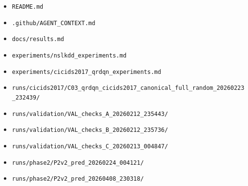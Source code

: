 \documentclass[12pt,a4paper]{report}
\begin{document}
\begin{itemize}
    \item \texttt{README.md}
    \item \texttt{.github/AGENT\_CONTEXT.md}
    \item \texttt{docs/results.md}
    \item \texttt{experiments/nslkdd\_experiments.md}
    \item \texttt{experiments/cicids2017\_qrdqn\_experiments.md}
    \item \texttt{runs/cicids2017/C03\_qrdqn\_cicids2017\_canonical\_full\_random\_20260223\_232439/}
    \item \texttt{runs/validation/VAL\_checks\_A\_20260212\_235443/}
    \item \texttt{runs/validation/VAL\_checks\_B\_20260212\_235736/}
    \item \texttt{runs/validation/VAL\_checks\_C\_20260213\_004847/}
    \item \texttt{runs/phase2/P2v2\_pred\_20260224\_004121/}
    \item \texttt{runs/phase2/P2v2\_pred\_20260408\_230318/}
\end{itemize}
\end{document}
